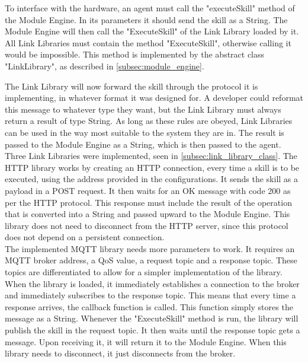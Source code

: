 To interface with the hardware, an agent must call the "executeSkill" method of the Module Engine. In its parameters it should send the skill as a String. The Module Engine will then call the "ExecuteSkill" of the Link Library loaded by it. All Link Libraries must contain the method "ExecuteSkill", otherwise calling it would be impossible. This method is implemented by the abstract class "LinkLibrary", as described in \ref{subsec:module_engine}.

The Link Library will now forward the skill through the protocol it is implementing, in whatever format it was designed for. A developer could reformat this message to whatever type they want, but the Link Library must always return a result of type String. As long as these rules are obeyed, Link Libraries can be used in the way most suitable to the system they are in. The result is passed to the Module Engine as a String, which is then passed to the agent.\\

Three Link Libraries were implemented, seen in \ref{subsec:link_library_class}. The \acrshort{HTTP} library works by creating an \acrshort{HTTP} connection, every time a skill is to be executed, using the address provided in the configurations. It sends the skill as a payload in a POST request. It then waits for an OK message with code 200 as per the \acrshort{HTTP} protocol. This response must include the result of the operation that is converted into a String and passed upward to the Module Engine. This library does not need to disconnect from the \acrshort{HTTP} server, since this protocol does not depend on a persistent connection.\\

The implemented \acrshort{MQTT} library needs more parameters to work. It requires an \acrshort{MQTT} broker address, a \acrfull{QoS} value, a request topic and a response topic. These topics are differentiated to allow for a simpler implementation of the library. When the library is loaded, it immediately establishes a connection to the broker and immediately subscribes to the response topic. This means that every time a response arrives, the callback function is called. This function simply stores the message as a String. Whenever the "ExecuteSkill" method is run, the library will publish the skill in the request topic. It then waits until the response topic gets a message. Upon receiving it, it will return it to the Module Engine. When this library needs to disconnect, it just disconnects from the broker.\\


